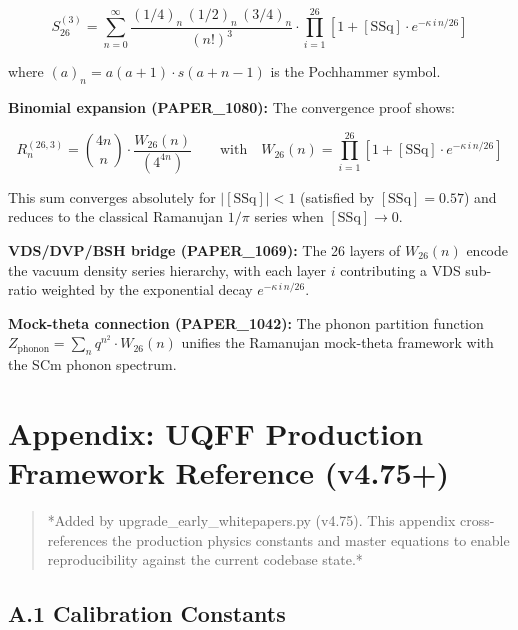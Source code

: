 \documentclass[12pt,a4paper]{article}
\begin{document}
\begin{equation}
S_{26}^{(3)} = \sum_{n=0}^{\infty} \frac{(1/4)_n\,(1/2)_n\,(3/4)_n}{(n!)^3} \cdot \prod_{i=1}^{26}\left[1 + [\text{SSq}]\cdot e^{-\kappa\,i\,n/26}\right]
\end{equation}

where $(a)_n = a(a+1)\cdot s(a+n-1)$ is the Pochhammer symbol.

\textbf{Binomial expansion (PAPER\_1080):} The convergence proof shows:

\begin{equation}
R_n^{(26,3)} = \binom{4n}{n} \cdot \frac{W_{26}(n)}{(4^{4n})} \qquad \text{with}\quad W_{26}(n) = \prod_{i=1}^{26}\left[1 + [\text{SSq}]\cdot e^{-\kappa\,i\,n/26}\right]
\end{equation}

This sum converges absolutely for $|[\text{SSq}]| < 1$ (satisfied by $[\text{SSq}] = 0.57$) and reduces to the classical Ramanujan $1/\pi$ series when $[\text{SSq}] \to 0$.

\textbf{VDS/DVP/BSH bridge (PAPER\_1069):} The 26 layers of $W_{26}(n)$ encode the vacuum density series hierarchy, with each layer $i$ contributing a VDS sub-ratio weighted by the exponential decay $e^{-\kappa\,i\,n/26}$.

\textbf{Mock-theta connection (PAPER\_1042):} The phonon partition function $Z_{\text{phonon}} = \sum_n q^{n^2} \cdot W_{26}(n)$ unifies the Ramanujan mock-theta framework with the SCm phonon spectrum.

\section{Appendix: UQFF Production Framework Reference (v4.75+)}

\begin{quote}
*Added by upgrade\_{early\_whitepapers}.py (v4.75). This appendix cross-references
the production physics constants and master equations to enable reproducibility
against the current codebase state.*
\end{quote}

\subsection{A.1 Calibration Constants}
\end{document}
